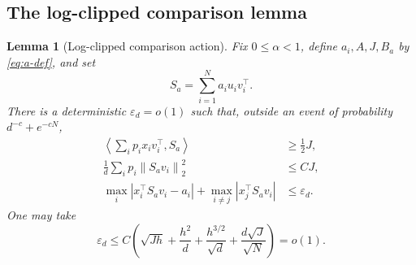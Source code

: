 \documentclass[11pt]{article}
\newtheorem{lemma}[theorem]{Lemma}
\theoremstyle{remark}
\newcommand{\ip}[2]{\left\langle #1,#2\right\rangle}
\newcommand{\norm}[1]{\left\lVert #1\right\rVert}
\begin{document}
\subsection{The log-clipped comparison lemma}

\begin{lemma}[Log-clipped comparison action]
\label{lem:log-clipped}
Fix \(0\leq\alpha<1\), define \(a_i,A,J,B_a\) by
\eqref{eq:a-def}, and set
\[
 S_a=\sum_{i=1}^Na_i u_iv_i^\top.
\]
There is a deterministic \(\varepsilon_d=o(1)\) such that, outside an
event of probability \(d^{-c}+e^{-cN}\),
\begin{align}
 \ip{\sum_i p_ix_iv_i^\top}{S_a}
 &\geq\frac12J,
 \label{eq:comparison-linear}\\
 \frac1d\sum_i p_i\norm{S_av_i}_2^2
 &\leq CJ,
 \label{eq:comparison-action}\\
 \max_i\left|x_i^\top S_av_i-a_i\right|
 +\max_{i\neq j}\left|x_j^\top S_av_i\right|
 &\leq\varepsilon_d.
 \label{eq:comparison-logits}
\end{align}
One may take
\begin{equation}
 \varepsilon_d
 \leq C\left(
 \sqrt{Jh}
 +\frac{h^2}{d}
 +\frac{h^{3/2}}{\sqrt d}
 +\frac{d\sqrt J}{\sqrt N}\right)=o(1).
 \label{eq:epsilon}
\end{equation}
\end{lemma}
\end{document}
